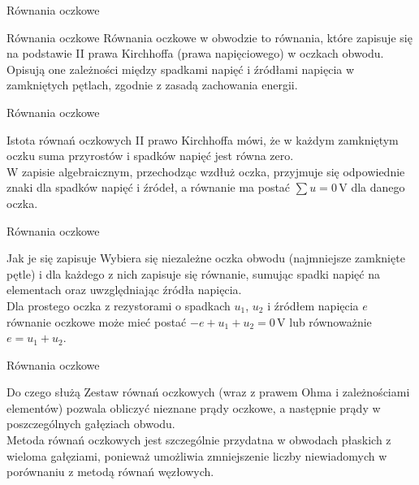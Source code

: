 \begin{frame}{Równania oczkowe}
	\begin{block}{Równania oczkowe}
		Równania oczkowe w obwodzie to równania, które zapisuje się na podstawie II prawa Kirchhoffa (prawa napięciowego) w oczkach obwodu.
		Opisują one zależności między spadkami napięć i źródłami napięcia w zamkniętych pętlach, zgodnie z zasadą zachowania energii.
	\end{block}
\end{frame}

\begin{frame}{Równania oczkowe}
	\begin{block}{Istota równań oczkowych}
		II prawo Kirchhoffa mówi, że w każdym zamkniętym oczku suma przyrostów i spadków napięć jest równa zero.\\
		W zapisie algebraicznym, przechodząc wzdłuż oczka, przyjmuje się odpowiednie znaki dla spadków napięć i źródeł, a równanie ma postać \(\sum u = 0\,\text{V}\) dla danego oczka.
	\end{block}
\end{frame}

\begin{frame}{Równania oczkowe}
	\begin{block}{Jak je się zapisuje}
		Wybiera się niezależne oczka obwodu (najmniejsze zamknięte pętle) i dla każdego z nich zapisuje się równanie, sumując spadki napięć na elementach oraz uwzględniając źródła napięcia.\\
		Dla prostego oczka z rezystorami o spadkach \(u_1\), \(u_2\) i źródłem napięcia \(e\) równanie oczkowe może mieć postać \(-e + u_1 + u_2 = 0\,\text{V}\) lub równoważnie \(e = u_1 + u_2\).
	\end{block}
\end{frame}

\begin{frame}{Równania oczkowe}
	\begin{block}{Do czego służą}
		Zestaw równań oczkowych (wraz z prawem Ohma i zależnościami elementów) pozwala obliczyć nieznane prądy oczkowe, a następnie prądy w poszczególnych gałęziach obwodu.\\
		Metoda równań oczkowych jest szczególnie przydatna w obwodach płaskich z wieloma gałęziami, ponieważ umożliwia zmniejszenie liczby niewiadomych w porównaniu z metodą równań węzłowych.
	\end{block}
\end{frame}

